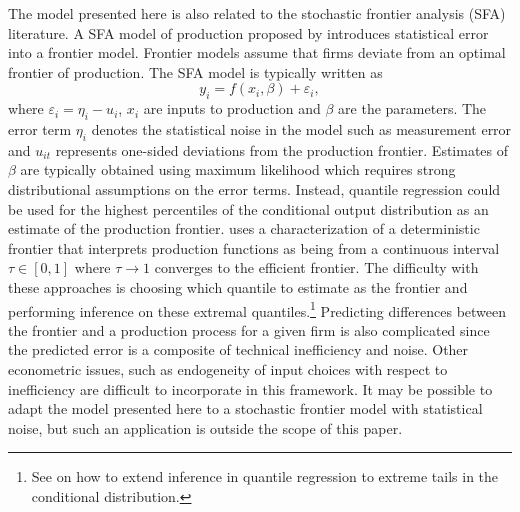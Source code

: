 \documentclass[12pt]{article}
\begin{document}
The model presented here is also related to the stochastic frontier analysis (SFA) literature. A SFA model of production proposed by \cite{Aigner1977} introduces statistical error into a frontier model. Frontier models assume that firms deviate from an optimal frontier of production. The SFA model is typically written as
\begin{equation}
y_{i}=f(x_{i}, \beta)+\varepsilon_{i},
\end{equation}
where $\varepsilon_{i}=\eta_{i}-u_{i}$, $x_{i}$ are inputs to production and $\beta$ are the parameters. The error term $\eta_{i}$ denotes the statistical noise in the model such as measurement error and $u_{it}$ represents one-sided deviations from the production frontier. Estimates of $\beta$ are typically obtained using maximum likelihood which requires strong distributional assumptions on the error terms. Instead, quantile regression could be used for the highest percentiles of the conditional output distribution as an estimate of the production frontier. \cite{Aragon2005} uses a characterization of a deterministic frontier that interprets production functions as being from a continuous interval $\tau\in[0,1]$ where $\tau\rightarrow 1$ converges to the efficient frontier. The difficulty with these approaches is choosing which quantile to estimate as the frontier and performing inference on these extremal quantiles.\footnote{See \cite{Chernozhukov2005a} on how to extend inference in quantile regression to extreme tails in the conditional distribution.} Predicting differences between the frontier and a production process for a given firm is also complicated since the predicted error is a composite of technical inefficiency and noise. Other econometric issues, such as endogeneity of input choices with respect to inefficiency are difficult to incorporate in this framework. It may be possible to adapt the model presented here to a stochastic frontier model with statistical noise, but such an application is outside the scope of this paper. 

\end{document}
